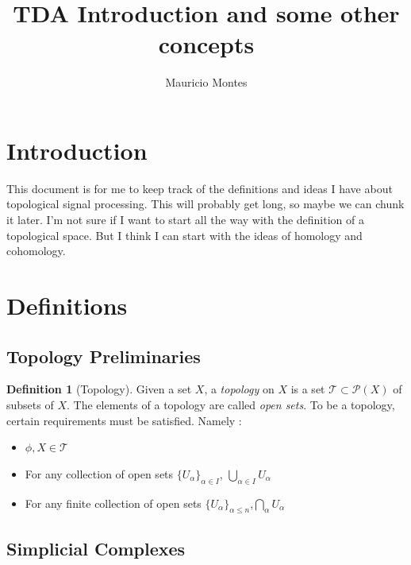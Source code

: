 \documentclass[12pt]{article}
\author{Mauricio Montes}
\title{TDA Introduction and some other concepts}
\theoremstyle{plain}
\theoremstyle{definition}
\newtheorem{definition}[thm]{Definition}
\begin{document}
\maketitle

\section{Introduction}

This document is for me to keep track of the definitions and ideas I have about topological signal
processing. This will probably get long, so maybe we can chunk it later. I'm not sure if I want to
start all the way with the definition of a topological space. But I think I can start with the ideas
of homology and cohomology. 


\section{Definitions}

\subsection{Topology Preliminaries}

\begin{definition}[Topology] Given a set $X$, a \textit{topology} on $X$ is a set $\mathcal{T} \subset \mathcal{P}(X)$ of subsets
of $X$. The elements of a topology are called \textit{open sets}. To be a topology, certain
requirements must be satisfied. Namely :

\begin{itemize}

  \item $\phi, X \in \mathcal{T}$

  \item For any collection of open sets $\{U_\alpha \}_{\alpha \in I}$, $\bigcup_{\alpha \in I} U_\alpha$

  \item For any finite collection of open sets $\{U_\alpha\}_{\alpha \leq n}$,$\bigcap_{\alpha} U_\alpha$
    
\end{itemize}

\end{definition}

\subsection{Simplicial Complexes}
\end{document}
